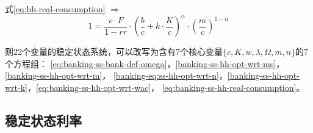 \subsubsection{}
式\eqref{eq:hh-real-consumption} $\Rightarrow$
\begin{equation}
  \label{eq:banking-ss-hh-real-consumption}
  1 = \frac{v \cdot F}{1-rr} \cdot {\left(
\frac{b}{c} + k \cdot \frac{K}{c}
  \right)}^{\alpha} \cdot {\left(
\frac{m}{c}
  \right)}^{1-\alpha}
\end{equation}

则22个变量的稳定状态系统，可以改写为含有7个核心变量$\{c,K,w,\lambda,\Omega,m,n\}$的7个方程组：
\eqref{eq:banking-ss-bank-def-omega}，\eqref{banking-ss-hh-opt-wrt-ms}，\eqref{banking-ss-hh-opt-wrt-m}，
\eqref{banking-eq:ss-hh-opt-wrt-n}，\eqref{banking-ss-hh-opt-wrt-k}，\eqref{eq:banking-ss-hh-opt-wrt-wac}， \eqref{eq:banking-ss-hh-real-consumption}。

\subsection{稳定状态利率}
